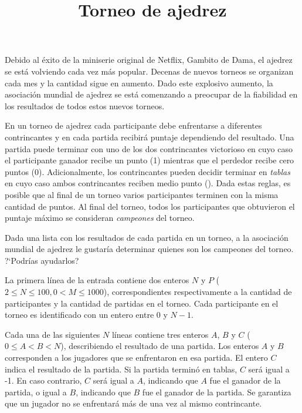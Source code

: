 \documentclass{oci}
\title{Torneo de ajedrez}
\begin{document}
\begin{problemDescription}
  Debido al éxito de la miniserie original de Netflix, Gambito de Dama, el ajedrez
  se está volviendo cada vez más popular.
  Decenas de nuevos torneos se organizan cada mes y la cantidad sigue en aumento.
  Dado este explosivo aumento, la asociación mundial de ajedrez se está comenzando a preocupar
  de la fiabilidad en los resultados de todos estos nuevos torneos.

  En un torneo de ajedrez cada participante debe enfrentarse a diferentes contrincantes y en cada
  partida recibirá puntaje dependiendo del resultado.
  Una partida puede terminar con uno de los dos contrincantes victorioso en cuyo caso el
  participante ganador recibe un punto (1) mientras que el perdedor recibe cero puntos (0).
  Adicionalmente, los contrincantes pueden decidir terminar en \emph{tablas} en cuyo caso ambos
  contrincantes reciben medio punto ().
  Dada estas reglas, es posible que al final de un torneo varios participantes terminen con
  la misma cantidad de puntos.
  Al final del torneo, todos los participantes que obtuvieron el puntaje máximo se consideran
  \emph{campeones} del torneo.

  Dada una lista con los resultados de cada partida en un torneo, a la asociación
  mundial de ajedrez le gustaría determinar quienes son los campeones del torneo.
  ?`Podrías ayudarlos?
\end{problemDescription}

\begin{inputDescription}
  La primera línea de la entrada contiene dos enteros $N$ y $P$
  ($2 \leq N \leq 100, 0 < M \leq 1000$),
  correspondientes respectivamente a la cantidad de participantes y la cantidad de partidas
  en el torneo.
  Cada participante en el torneo es identificado con un entero entre 0 y $N-1$.

  Cada una de las siguientes $N$ líneas contiene tres enteros $A$, $B$ y $C$
  ($0\leq A < B < N$), describiendo el resultado de una partida.
  Los enteros $A$ y $B$ corresponden a los jugadores que se enfrentaron en esa partida.
  El entero $C$ indica el resultado de la partida.
  Si la partida terminó en tablas, $C$ será igual a {-1}.
  En caso contrario, $C$ será igual a $A$, indicando que $A$ fue el ganador de la partida, o igual
  a $B$, indicando que $B$ fue el ganador de la partida.
  Se garantiza que un jugador no se enfrentará más de una vez al mismo contrincante.
\end{inputDescription}
\end{document}

